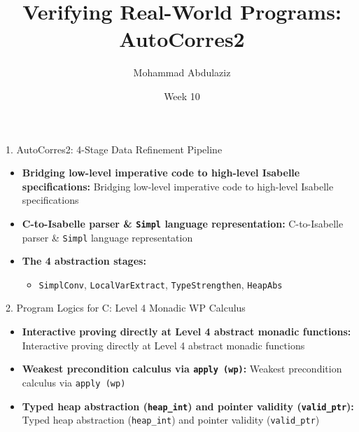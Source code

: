 \documentclass[compress,10pt,xcolor=dvipsnames]{beamer}
\title[Verifying Real-World Programs]{Verifying Real-World Programs: AutoCorres2}
\author[7CCSACTP]{Mohammad Abdulaziz}
\date{Week 10}
\begin{document}

\begin{frame}{1. AutoCorres2: 4-Stage Data Refinement Pipeline}

\begin{itemize}
  \item \textbf{Bridging low-level imperative code to high-level Isabelle specifications:} Bridging low-level imperative code to high-level Isabelle specifications
  \item \textbf{C-to-Isabelle parser & \texttt{Simpl} language representation:} C-to-Isabelle parser & \texttt{Simpl} language representation
  \item \textbf{The 4 abstraction stages:}
    \begin{itemize}
      \item \texttt{SimplConv}, \texttt{LocalVarExtract}, \texttt{TypeStrengthen}, \texttt{HeapAbs}
    \end{itemize}
\end{itemize}
\end{frame}

\begin{frame}{2. Program Logics for C: Level 4 Monadic WP Calculus}

\begin{itemize}
  \item \textbf{Interactive proving directly at Level 4 abstract monadic functions:} Interactive proving directly at Level 4 abstract monadic functions
  \item \textbf{Weakest precondition calculus via \texttt{apply (wp)}:} Weakest precondition calculus via \texttt{apply (wp)}
  \item \textbf{Typed heap abstraction (\texttt{heap_int}) and pointer validity (\texttt{valid_ptr}):} Typed heap abstraction (\texttt{heap_int}) and pointer validity (\texttt{valid_ptr})
\end{itemize}
\end{frame}
\end{document}
